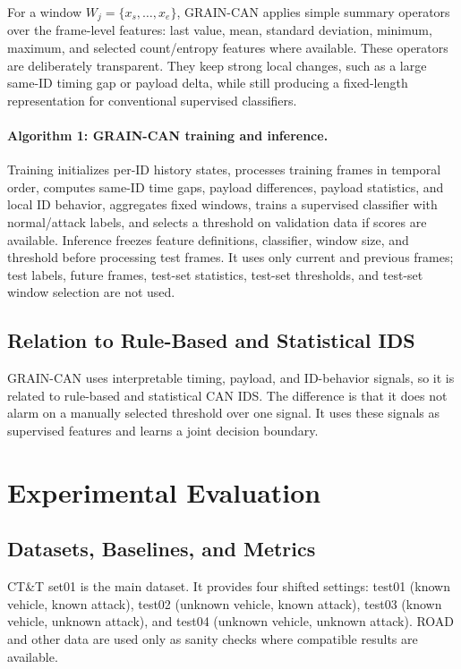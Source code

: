 \documentclass[runningheads]{llncs}
\begin{document}
For a window \(W_j=\{x_s,\ldots,x_e\}\), GRAIN-CAN applies simple summary operators over the frame-level features: last value, mean, standard deviation, minimum, maximum, and selected count/entropy features where available.  These operators are deliberately transparent.  They keep strong local changes, such as a large same-ID timing gap or payload delta, while still producing a fixed-length representation for conventional supervised classifiers.

\paragraph{Algorithm 1: GRAIN-CAN training and inference.}
Training initializes per-ID history states, processes training frames in temporal order, computes same-ID time gaps, payload differences, payload statistics, and local ID behavior, aggregates fixed windows, trains a supervised classifier with normal/attack labels, and selects a threshold on validation data if scores are available.  Inference freezes feature definitions, classifier, window size, and threshold before processing test frames.  It uses only current and previous frames; test labels, future frames, test-set statistics, test-set thresholds, and test-set window selection are not used.

\subsection{Relation to Rule-Based and Statistical IDS}
GRAIN-CAN uses interpretable timing, payload, and ID-behavior signals, so it is related to rule-based and statistical CAN IDS.  The difference is that it does not alarm on a manually selected threshold over one signal.  It uses these signals as supervised features and learns a joint decision boundary.

\section{Experimental Evaluation}
\subsection{Datasets, Baselines, and Metrics}
CT\&T set01 is the main dataset.  It provides four shifted settings: test01 (known vehicle, known attack), test02 (unknown vehicle, known attack), test03 (known vehicle, unknown attack), and test04 (unknown vehicle, unknown attack).  ROAD and other data are used only as sanity checks where compatible results are available.
\end{document}
